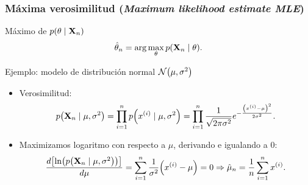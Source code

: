 \documentclass[table]{beamer}
\begin{document}
\begin{frame}
    \frametitle{Máxima verosimilitud (\emph{Maximum likelihood estimate MLE})}
    \begin{block}{Máximo de $\pdf{\theta \mid \Xvec_{n}}$}
        \begin{equation*}
            \hat{\theta}_{n}
            = \arg \max_{\theta} \pdf{\Xvec_{n} \mid \theta} .
        \end{equation*}
    \end{block}
    \begin{exampleblock}{Ejemplo: modelo de distribución normal $\normal{\mu}{\sigma^{2}}$}
        \begin{itemize}
            \item Verosimilitud:
                \begin{equation*}
                    \pdf{\Xvec_{n} \mid \mu , \sigma^{2}}
                    = \prod_{i = 1}^{n} \pdf{x^{\parens{i}} \mid \mu , \sigma^{2}}
                    = \prod_{i = 1}^{n} \frac{1}{\sqrt{2 \pi \sigma^{2}}} e^{- \frac{\parens{x^{\parens{i}} - \mu}^{2}}{2 \sigma^{2}}} .
                \end{equation*}
            \item Maximizamos logaritmo con respecto a $\mu$, derivando e igualando a $0$:
                \begin{equation*}
                    \frac{d \sparens{\ln \parens{\pdf{\Xvec_{n} \mid \mu , \sigma^{2}}}}}{d \mu}
                    = \sum_{i = 1}^{n} \frac{1}{\sigma^{2}} \parens{x^{\parens{i}} - \mu}
                    = 0
                    \Rightarrow \hat{\mu}_{n} = \frac{1}{n} \sum_{i = 1}^{n} x^{\parens{i}} .
                \end{equation*}
        \end{itemize}
    \end{exampleblock}
\end{frame}
\end{document}

